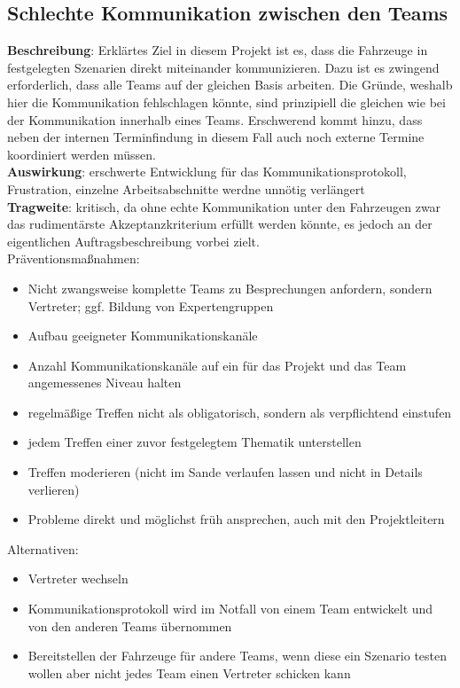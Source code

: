 \documentclass[a4paper, 12pt, titlepage]{scrartcl}
\begin{document}
	\subsection{Schlechte Kommunikation zwischen den Teams}
		\textbf{Beschreibung}: Erkl\"artes Ziel in diesem Projekt ist es, dass die Fahrzeuge in festgelegten Szenarien direkt miteinander kommunizieren. Dazu ist es zwingend erforderlich, dass alle Teams auf der gleichen Basis arbeiten. Die Gr\"unde, weshalb hier die Kommunikation fehlschlagen k\"onnte, sind prinzipiell die gleichen wie bei der Kommunikation innerhalb eines Teams. Erschwerend kommt hinzu, dass neben der internen Terminfindung in diesem Fall auch noch externe Termine koordiniert werden m\"ussen.\\
		\textbf{Auswirkung}: erschwerte Entwicklung f\"ur das Kommunikationsprotokoll, Frustration, einzelne Arbeitsabschnitte werdne unn\"otig verl\"angert\\
		\textbf{Tragweite}: kritisch, da ohne echte Kommunikation unter den Fahrzeugen zwar das rudiment\"arste Akzeptanzkriterium erf\"ullt werden k\"onnte, es jedoch an der eigentlichen Auftragsbeschreibung vorbei zielt.\\
		Pr\"aventionsma\ss nahmen:
			\begin{itemize}
				\item Nicht zwangsweise komplette Teams zu Besprechungen anfordern, sondern Vertreter; ggf. Bildung von Expertengruppen
				\item Aufbau geeigneter Kommunikationskan\"ale
				\item Anzahl Kommunikationskan\"ale auf ein f\"ur das Projekt und das Team angemessenes Niveau halten
				\item regelm\"a\ss ige Treffen nicht als obligatorisch, sondern als verpflichtend einstufen
				\item jedem Treffen einer zuvor festgelegtem Thematik unterstellen
				\item Treffen moderieren (nicht im Sande verlaufen lassen und nicht in Details verlieren)
				\item Probleme direkt und m\"oglichst fr\"uh ansprechen, auch mit den Projektleitern
			\end{itemize}
		Alternativen: 
			\begin{itemize}
				\item Vertreter wechseln
				\item Kommunikationsprotokoll wird im Notfall von einem Team entwickelt und von den anderen Teams \"ubernommen
				\item Bereitstellen der Fahrzeuge f\"ur andere Teams, wenn diese ein Szenario testen wollen aber nicht jedes Team einen Vertreter schicken kann
			\end{itemize}
		
\end{document}
